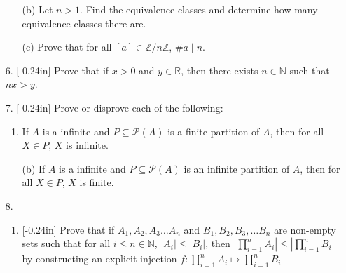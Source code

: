 \documentclass[letterpaper,12pt]{article}
\theoremstyle{definition}
\begin{document}
\pagebreak
\begin{enumerate}
    \item[] \begin{enumerate}
        \item[(b)] Let $n >1$. Find the equivalence classes and determine how many equivalence classes there are.
    \end{enumerate}
\end{enumerate}
\pagebreak
\begin{enumerate}
    \item[] \begin{enumerate}
        \item[(c)] Prove that for all $[a] \in \mathbb{Z}/n\mathbb{Z}$, $\# a \mid n$.
    \end{enumerate}
\end{enumerate}
\pagebreak
\begin{enumerate}
    \item[6.]  
    \reversemarginpar{}[-0.24in] 
Prove that if $x > 0$ and $y \in \mathbb{R}$, then there exists $n \in \mathbb{N}$ such that $nx > y$.
\end{enumerate}
\pagebreak
\begin{enumerate}
    \item[7.] \reversemarginpar{}[-0.24in] Prove or disprove each of the following: \begin{enumerate}
        \item If $A$ is a infinite and $P \subseteq \mathcal{P}(A)$ is a finite partition of $A$, then for all $X \in P$, $X$ is infinite.
    \end{enumerate}
\end{enumerate}
\pagebreak
\begin{enumerate}
    \item[] \begin{enumerate}
        \item[(b)] If $A$ is a infinite and $P \subseteq \mathcal{P}(A)$ is an infinite partition of $A$, then for all $X \in P$, $X$ is finite.
    \end{enumerate}
\end{enumerate}
\pagebreak
\begin{enumerate}
    \item[8.] \begin{enumerate}
        \item \reversemarginpar{}[-0.24in] Prove that if $A_1,A_2,A_3 \ldots A_n$ and $B_1,B_2,B_3,\ldots B_n$ are non-empty sets such that for all $i \leq n \in \mathbb{N}$, $|A_i| \leq |B_i|$, then $|\prod_{i = 1}^n A_i |\leq |\prod_{i = 1}^n B_i |$ by constructing an explicit injection $f: \prod_{i = 1}^n A_i  \mapsto \prod_{i = 1}^n B_i $
    \end{enumerate}
\end{enumerate}
\end{document}
